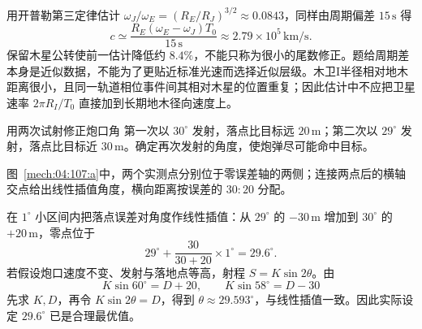 {\begin{xesolution}
用开普勒第三定律估计 $\omega_J/\omega_E=(R_E/R_J)^{3/2}\approx0.0843$，同样由周期偏差 $15\,\mathrm s$ 得
\[
c\simeq\frac{R_E(\omega_E-\omega_J)T_0}{15\,\mathrm s}
\approx2.79\times10^5\,\mathrm{km/s}.
\]
保留木星公转使前一估计降低约 $8.4\%$，不能只称为很小的尾数修正。题给周期差本身是近似数据，不能为了更贴近标准光速而选择近似层级。木卫I半径相对地木距离很小，且同一轨道相位事件间其相对木星的位置重复；因此估计中不应把卫星速率 $2\pi R_I/T_0$ 直接加到长期地木径向速度上。
\end{xesolution}

\begin{origexamplebox}{用两次试射修正炮口角}\label{ch04:ex:k11-2-107}
第一次以 $30^\circ$ 发射，落点比目标远 $20\,\mathrm m$；第二次以 $29^\circ$ 发射，落点比目标近 $30\,\mathrm m$。确定再次发射的角度，使炮弹尽可能命中目标。

\begin{qualityfigure}
\label{mech:04:107:q}
\end{qualityfigure}
\end{origexamplebox}
\begin{xesolution}
\begin{qualityfigure}
\label{mech:04:107:a}
\end{qualityfigure}
图~\ref{mech:04:107:a}中，两个实测点分别位于零误差轴的两侧；连接两点后的横轴交点给出线性插值角度，横向距离按误差的 $30:20$ 分配。

在 $1^\circ$ 小区间内把落点误差对角度作线性插值：从 $29^\circ$ 的 $-30\,\mathrm m$ 增加到 $30^\circ$ 的 $+20\,\mathrm m$，零点位于
\[
29^\circ+\frac{30}{30+20}\times1^\circ
=\boxed{29.6^\circ}.
\]
若假设炮口速度不变、发射与落地点等高，射程 $S=K\sin2\theta$。由
\[
K\sin60^\circ=D+20,
\qquad K\sin58^\circ=D-30
\]
先求 $K,D$，再令 $K\sin2\theta=D$，得到 $\theta\approx29.593^\circ$，与线性插值一致。因此实际设定 $29.6^\circ$ 已是合理最优值。
\end{xesolution}

}
